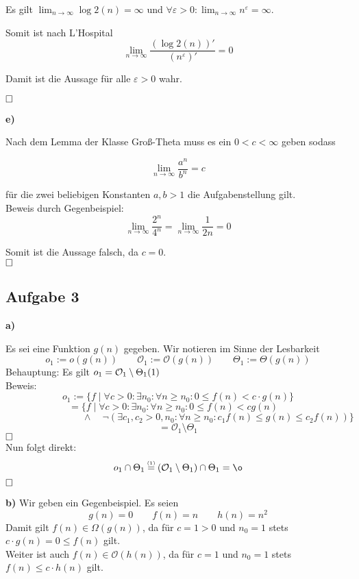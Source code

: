 \documentclass[a4paper,graphics,11pt]{article}
\newcommand{\aufgabe}[1]{\subsection*{Aufgabe #1}}
\newcommand{\up}[2]{\mathrel{\overset{\makebox[0pt]{\mbox{\normalfont\tiny #2}}}{#1}}}
\begin{document}
Es gilt $\lim_{n\rightarrow\infty} \log2 (n) = \infty$ und $\forall\varepsilon > 0 :
\lim_{n\rightarrow\infty}  n^\varepsilon = \infty$.

Somit ist nach L'Hospital 
$$
\lim_{n\rightarrow\infty} \frac{(\log2(n))'}{(n^\varepsilon)'} = 0
$$

Damit ist die Aussage für alle $\varepsilon>0$ wahr.

$\hfill\square$

\textbf{e)}


Nach dem Lemma der Klasse Groß-Theta muss es ein $ 0 < c< \infty$ geben sodass

$$
\lim_{n\rightarrow\infty} \frac{a^n}{b^n} = c
$$

für die zwei beliebigen Konstanten $a,b > 1$ die Aufgabenstellung gilt.\\
Beweis durch Gegenbeispiel:\\
$$
\lim_{n\rightarrow\infty} \frac{2^n}{4^n} = \lim_{n\rightarrow\infty} \frac{1}{2n} = 0
$$

Somit ist die Aussage falsch, da $c=0$.\\

$\hfill\square$

\newpage

\aufgabe{3}
\textbf{a)}

Es sei eine Funktion $g(n)$ gegeben.
Wir notieren im Sinne der Lesbarkeit
$$
	o_1 := o(g(n)) \qquad \mathcal{O}_1 := \mathcal{O}(g(n)) \qquad \Theta_1 := \Theta(g(n))
$$
Behauptung: Es gilt $o_1 = \mathcal{O}_1 \setminus \Theta_1\hfill(1)$\\
Beweis:
$$
	o_1 := \{f \mid \forall c > 0 : \exists n_0 : \forall n\geq n_0 : 0 \leq f(n) < c\cdot g(n)\}
$$$$
	= \{f \mid \forall c > 0 : \exists n_0 : \forall n\geq n_0 : 0 \leq f(n) < cg(n)\quad
$$$$
	\qquad\qquad\qquad\qquad\land \quad \lnot(\exists c_1,c_2 > 0,n_0 : \forall n\geq n_0 : c_1f(n) \leq g(n) \leq c_2f(n))\}
$$$$
	= \mathcal{O}_1 \setminus \Theta_1
$$
$\hfill\square$\\
Nun folgt direkt:
$$
	o_1 \cap \Theta_1
	\up{=}{(1)} (\mathcal{O}_1 \setminus \Theta_1) \cap \Theta_1 = \o
$$
$\hfill\square$

\textbf{b)}
Wir geben ein Gegenbeispiel.
Es seien
$$
	g(n) = 0 \qquad f(n) = n \qquad h(n) = n^2
$$
Damit gilt $f(n) \in \Omega(g(n))$, da für $c = 1 > 0$ und $n_0 = 1$ stets $c\cdot g(n) = 0 \leq f(n)$ gilt.\\
Weiter ist auch $f(n) \in \mathcal{O}(h(n))$, da für $c = 1$ und $n_0 = 1$ stets $f(n) \leq c\cdot h(n)$ gilt.
\end{document}
